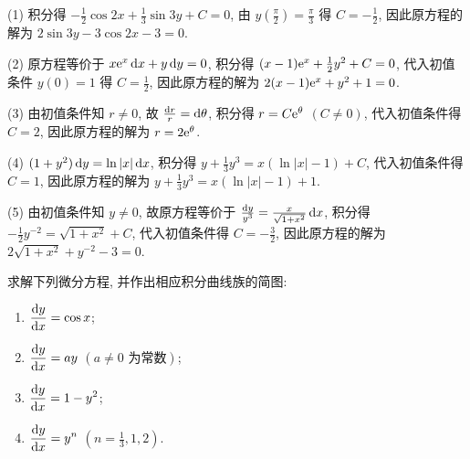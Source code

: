 \begin{solve}
  (1) 积分得 $-\frac{1}{2}\cos2x+\frac{1}{3}\sin3y+C=0$, 
  由 $y\left(\frac{\pi}{2}\right)=\frac{\pi}{3}$ 得 $C=-\frac{1}{2}$,
  因此原方程的解为 $2\sin3y-3\cos2x-3=0$.

  (2) 原方程等价于 $x\mathrm{e}^x\mathop{}\!\mathrm{d} x+y\mathop{}\!\mathrm{d} y=0$, 积分得 $(x-1)\mathrm{e}^x+\frac{1}{2}y^2+C=0$, 
  代入初值条件 $y(0)=1$ 得 $C=\frac{1}{2}$, 因此原方程的解为 $2(x-1)\mathrm{e}^x+y^2+1=0$.

  (3) 由初值条件知 $r\neq0$, 故 $\frac{\mathop{}\!\mathrm{d} r}{r}=\mathop{}\!\mathrm{d}\theta$, 积分得 $r=C\mathrm{e}^{\theta}$ $(C\neq 0)$,
  代入初值条件得 $C=2$, 因此原方程的解为 $r=2\mathrm{e}^{\theta}$.

  (4) $(1+y^2)\mathop{}\!\mathrm{d} y=\ln|x|\mathop{}\!\mathrm{d} x$, 积分得 $y+\frac{1}{3}y^3=x(\ln|x|-1)+C$, 
  代入初值条件得$C=1$, 因此原方程的解为 $y+\frac{1}{3}y^3=x(\ln|x|-1)+1$.

  (5) 由初值条件知 $y\neq 0$, 故原方程等价于 $\frac{\mathop{}\!\mathrm{d} y}{y^3}=\frac{x}{\sqrt{1+x^2}}\mathop{}\!\mathrm{d} x$, 
  积分得 $-\frac{1}{2}y^{-2}=\sqrt{1+x^2}+C$, 代入初值条件得 $C=-\frac{3}{2}$, 
  因此原方程的解为 $2\sqrt{1+x^2}+y^{-2}-3=0$.
\end{solve}



\begin{exercise}
  求解下列微分方程, 并作出相应积分曲线族的简图:
  \begin{enumerate}[(1)]
  \item $\displaystyle\frac{\mathop{}\!\mathrm{d} y}{\mathop{}\!\mathrm{d} x}=\cos x$;
  \item $\displaystyle\frac{\mathop{}\!\mathrm{d} y}{\mathop{}\!\mathrm{d} x}=ay$ $(a\neq 0\text{\ 为常数})$;
  \item $\displaystyle\frac{\mathop{}\!\mathrm{d} y}{\mathop{}\!\mathrm{d} x}=1-y^2$;
  \item $\displaystyle\frac{\mathop{}\!\mathrm{d} y}{\mathop{}\!\mathrm{d} x}=y^n$ $(n=\frac{1}{3},1,2)$.
  \end{enumerate}
\end{exercise}

